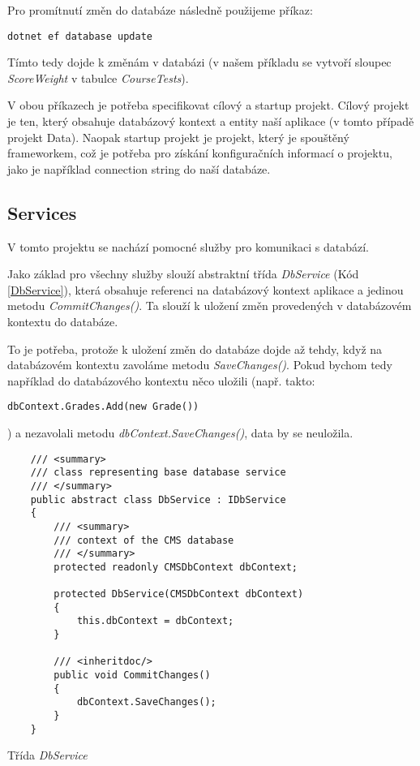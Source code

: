 Pro promítnutí změn do databáze následně použijeme příkaz:

\begin{lstlisting}
dotnet ef database update
\end{lstlisting}

Tímto tedy dojde k změnám v databázi (v našem příkladu se vytvoří sloupec \textit{ScoreWeight} v tabulce \textit{CourseTests}).

V obou příkazech je potřeba specifikovat cílový a startup projekt. Cílový projekt je ten, který obsahuje databázový kontext a entity naší aplikace (v tomto případě projekt Data). Naopak startup projekt je projekt, který je spouštěný frameworkem, což je potřeba pro získání konfiguračních informací o projektu, jako je například connection string do naší databáze.

\subsection{Services}
V tomto projektu se nachází pomocné služby pro komunikaci s databází. 

Jako základ pro všechny služby slouží abstraktní třída \textit{DbService} (Kód \ref{DbService}), která obsahuje referenci na databázový kontext aplikace a jedinou metodu \textit{CommitChanges()}. Ta slouží k uložení změn provedených v databázovém kontextu do databáze. 

To je potřeba, protože k uložení změn do databáze dojde až tehdy, když na databázovém kontextu zavoláme metodu \textit{SaveChanges()}. Pokud bychom tedy například do databázového kontextu něco uložili (např. takto: 
\begin{lstlisting}
dbContext.Grades.Add(new Grade())
\end{lstlisting})
a nezavolali metodu \textit{dbContext.SaveChanges()}, data by se neuložila.

\begin{program}
	\begin{lstlisting}
	/// <summary>
	/// class representing base database service
	/// </summary>
	public abstract class DbService : IDbService
	{
		/// <summary>
		/// context of the CMS database
		/// </summary>
		protected readonly CMSDbContext dbContext;
		
		protected DbService(CMSDbContext dbContext)
		{
			this.dbContext = dbContext;
		}
		
		/// <inheritdoc/>
		public void CommitChanges()
		{
			dbContext.SaveChanges();
		}
	}
	\end{lstlisting}
	\caption{Třída \textit{DbService}}
	\label{DbService}
\end{program}

